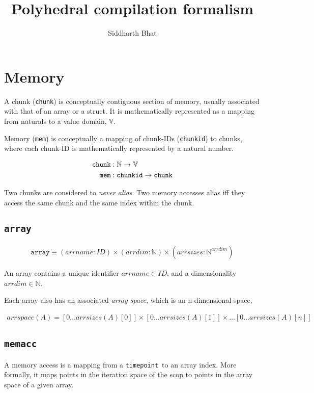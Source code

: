 \documentclass{article}
\title{Polyhedral compilation formalism}
\author{Siddharth Bhat}
\newcommand{\N}{\mathbb{N}}
\newcommand{\val}{\mathbb{V}}
\newcommand{\chunkid}{\texttt{chunkid}}
\newcommand{\chunk}{\texttt{chunk}}
\newcommand{\mem}{\texttt{mem}}
\newcommand{\memacc}{\texttt{memacc}}
\newcommand{\timepoint}{\texttt{timepoint}}
\newcommand{\arr}{\texttt{array}}
\begin{document}
\maketitle
\date{}
\tableofcontents

\section{Memory}
A chunk (\chunk) is conceptually contiguous section of memory, usually associated
with that of an array or a struct. It is mathematically represented as 
a mapping from naturals to a value domain, $\val$.

Memory (\mem) is conceptually a mapping of chunk-IDs (\chunkid) to chunks, where each chunk-ID
is mathematically represented by a natural number.


\begin{align*}
    \chunk &: \N \to \val \\ 
    \mem &: \text{\chunkid} \to \chunk
\end{align*}

Two chunks are considered to \textit{never alias}. Two memory accesses alias
iff they access the same chunk and the same index within the chunk.


\subsection{\arr}
\begin{align*}
    \arr \equiv (arrname: ID) \times (arrdim: \N)  \times (arrsizes: \N^{arrdim})
\end{align*}

An array contains a unique identifier $arrname \in ID$, and a
dimensionality $arrdim \in \N$. 

Each array also has an associated \textit{array space}, which is an n-dimensional
space, 

\begin{align*}
arrspace(A) = [0 \dots arrsizes(A)[0]] \times [0 \dots arrsizes(A)[1]] \times \dots [0 \dots arrsizes(A)[n]]
\end{align*}

\subsection{\memacc}
A memory access is a mapping from a \timepoint~to an array index. More formally,
it maps points in the iteration space of the scop to points in the array space
of a given array.
\end{document}

